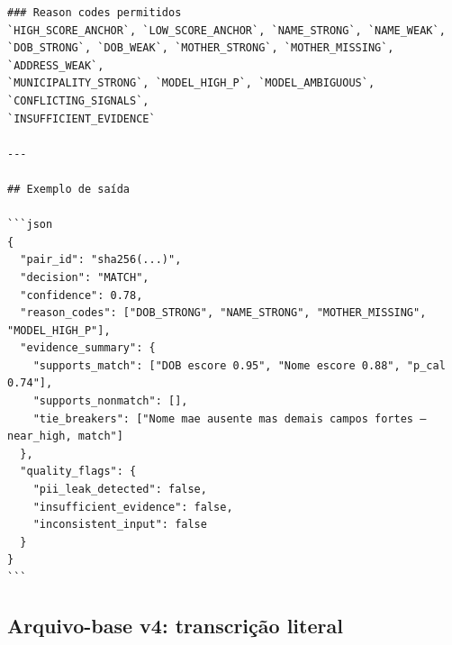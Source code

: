 {\begin{verbatim}
### Reason codes permitidos
`HIGH_SCORE_ANCHOR`, `LOW_SCORE_ANCHOR`, `NAME_STRONG`, `NAME_WEAK`,
`DOB_STRONG`, `DOB_WEAK`, `MOTHER_STRONG`, `MOTHER_MISSING`, `ADDRESS_WEAK`,
`MUNICIPALITY_STRONG`, `MODEL_HIGH_P`, `MODEL_AMBIGUOUS`, `CONFLICTING_SIGNALS`,
`INSUFFICIENT_EVIDENCE`

---

## Exemplo de saída

```json
{
  "pair_id": "sha256(...)",
  "decision": "MATCH",
  "confidence": 0.78,
  "reason_codes": ["DOB_STRONG", "NAME_STRONG", "MOTHER_MISSING", "MODEL_HIGH_P"],
  "evidence_summary": {
    "supports_match": ["DOB escore 0.95", "Nome escore 0.88", "p_cal 0.74"],
    "supports_nonmatch": [],
    "tie_breakers": ["Nome mae ausente mas demais campos fortes — near_high, match"]
  },
  "quality_flags": {
    "pii_leak_detected": false,
    "insufficient_evidence": false,
    "inconsistent_input": false
  }
}
```
\end{verbatim}
}

\subsection*{Arquivo-base v4: transcrição literal}


